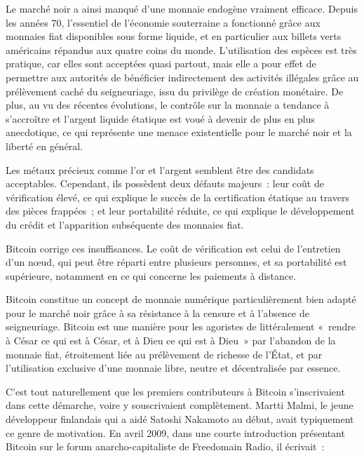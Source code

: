 Le marché noir a ainsi manqué d'une monnaie endogène vraiment efficace. Depuis les années 70, l'essentiel de l'économie souterraine a fonctionné grâce aux monnaies fiat disponibles sous forme liquide, et en particulier aux billets verts américains répandus aux quatre coins du monde. L'utilisation des espèces est très pratique, car elles sont acceptées quasi partout, mais elle a pour effet de permettre aux autorités de bénéficier indirectement des activités illégales grâce au prélèvement caché du seigneuriage, issu du privilège de création monétaire. De plus, au vu des récentes évolutions, le contrôle sur la monnaie a tendance à s'accroître et l'argent liquide étatique est voué à devenir de plus en plus anecdotique, ce qui représente une menace existentielle pour le marché noir et la liberté en général.

Les métaux précieux comme l'or et l'argent semblent être des candidats acceptables. Cependant, ils possèdent deux défauts majeurs~: leur coût de vérification élevé, ce qui explique le succès de la certification étatique au travers des pièces frappées~; et leur portabilité réduite, ce qui explique le développement du crédit et l'apparition subséquente des monnaies fiat.

Bitcoin corrige ces insuffisances. Le coût de vérification est celui de l'entretien d'un nœud, qui peut être réparti entre plusieurs personnes, et sa portabilité est supérieure, notamment en ce qui concerne les paiements à distance.

Bitcoin constitue un concept de monnaie numérique particulièrement bien adapté pour le marché noir grâce à sa résistance à la censure et à l'absence de seigneuriage. Bitcoin est une manière pour les agoristes de littéralement «~rendre à César ce qui est à César, et à Dieu ce qui est à Dieu~» par l'abandon de la monnaie fiat, étroitement liée au prélèvement de richesse de l'État, et par l'utilisation exclusive d'une monnaie libre, neutre et décentralisée par essence.

C'est tout naturellement que les premiers contributeurs à Bitcoin s'inscrivaient dans cette démarche, voire y souscrivaient complètement. Martti Malmi, le jeune développeur finlandais qui a aidé Satoshi Nakamoto au début, avait typiquement ce genre de motivation. En avril 2009, dans une courte introduction présentant Bitcoin sur le forum anarcho-capitaliste de Freedomain Radio, il écrivait~:

